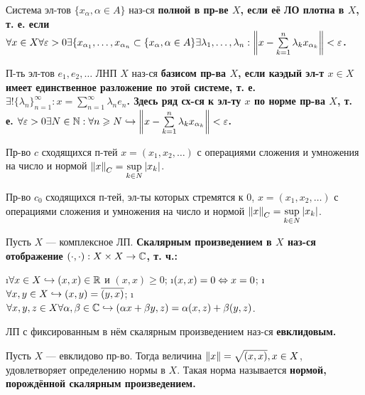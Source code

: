 \begin{defn}
Система эл-тов $\{x_\alpha, \alpha \in A\}$ наз-ся \bf{полной} в пр-ве $X$, если её ЛО плотна в $X$, т. е. если $\forall x \in X \forall \varepsilon > 0 \exists \{x_{\alpha_1}, \dots, x_{\alpha_n} \subset \{x_\alpha, \alpha \in A\} \exists \lambda_1, \dots, \lambda_n: \left\lVert x-\sum\limits_{k=1}^n \lambda_k x_{\alpha_k}\right\rVert < \varepsilon$.
\end{defn}

\begin{defn}
П-ть эл-тов $e_1, e_2, \dots$ ЛНП $X$ наз-ся \bf{базисом} пр-ва $X$, если каэдый эл-т $x \in X$ имеет единственное разложение по этой системе, т. е. $\exists ! \{\lambda_n\}_{n=1}^\infty: x = \sum\limits_{n=1}^\infty \lambda_n e_n$. Здесь ряд сх-ся к эл-ту $x$ по норме пр-ва $X$, т. е. $\forall \varepsilon > 0 \exists N \in \mathbb{N}: \forall n \geqslant N \hookrightarrow \left\lVert x - \sum\limits_{k=1}^n \lambda_k x_{\alpha_k}\right\rVert < \varepsilon$.
\end{defn}

\begin{defn}
Пр-во $c$ сходящихся п-тей $x=(x_1, x_2, \dots)$ с операциями сложения и умножения на число и нормой $\left\lVert x\right\rVert_C = \sup\limits_{k \in N} |x_k|$.
\end{defn}

\begin{defn}
Пр-во $c_0$ сходящихся п-тей, эл-ты которых стремятся к 0, $x=(x_1, x_2, \dots)$ с операциями сложения и умножения на число и нормой $\left\lVert x\right\rVert_C = \sup\limits_{k \in N} |x_k|$.
\end{defn}

\begin{defn}
Пусть $X$ --- комплексное ЛП. \bf{Скалярным произведением} в $X$ наз-ся отображение $(\cdot, \cdot): X \times X \rightarrow \mathbb{C}$, т. ч.:
\begin{enumerate}
\i $\forall x \in X \hookrightarrow (x, x) \in \mathbb{R}$ и $(x, x) \ge 0$;
\i $(x, x)=0 \Leftrightarrow x = 0$;
\i $\forall x, y \in X \hookrightarrow (x, y) = \overline{(y, x)}$;
\i $\forall x, y, z \in X \forall \alpha, \beta \in \mathbb{C} \hookrightarrow (\alpha x + \beta y, z) = \alpha (x, z) + \beta(y, z)$.
\end{enumerate}
\end{defn}

\begin{defn}
ЛП с фиксированным в нём скалярным произведением наз-ся \bf{евклидовым}.
\end{defn}

\begin{stmt}
Пусть $X$ --- евклидово пр-во. Тогда величина $\left\lVert x\right\rVert = \sqrt{(x, x)}, x \in X$, удовлетворяет определению нормы в $X$. Такая норма называется \bf{нормой, порождённой скалярным произведением}. 
\end{stmt}

